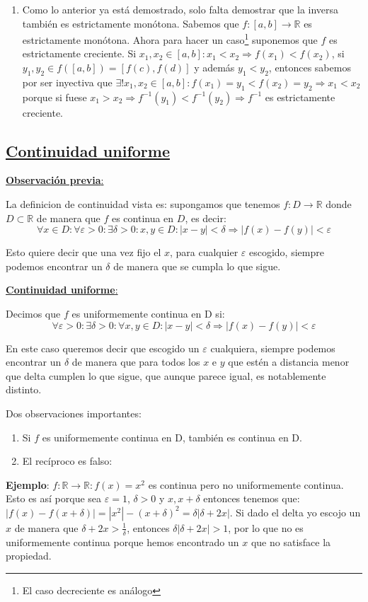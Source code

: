 \documentclass[10pt,a4paper,openright]{book}
\begin{document}
\begin{enumerate}
\item Como lo anterior ya está demostrado, solo falta demostrar que la inversa también es estrictamente monótona. Sabemos que $f: [a,b]\rightarrow \mathbb R$ es estrictamente monótona. Ahora para hacer un caso\footnote{El caso decreciente es análogo} suponemos que $f$ es estrictamente creciente. Si $x_1,x_2\in [a,b]: x_1<x_2\Rightarrow f(x_1)<f(x_2)$, si $y_1,y_2\in f([a,b])=[f(c), f(d)]$ y además $y_1<y_2$, entonces sabemos por ser inyectiva que $\exists! x_1, x_2\in [a,b]: f(x_1)=y_1 < f(x_2)=y_2\Rightarrow x_1< x_2$ porque si fuese $x_1>x_2\Rightarrow f^{-1}(y_1)<f^{-1}(y_2)\Rightarrow f^{-1}$ es estrictamente creciente.
\end{enumerate} 
\vspace{0.25cm}

\subsection*{\underline{Continuidad uniforme}}
\underline{\textbf{Observación previa}:}\par
La definicion de continuidad vista es: supongamos que tenemos $f: D\rightarrow \mathbb R$ donde $D\subset \mathbb R$ de manera que $f$ es continua en $D$, es decir:
$$\forall x\in D: \forall \varepsilon>0: \exists \delta>0 : x,y \in D: |x-y|<\delta\Rightarrow |f(x)-f(y)|<\varepsilon$$

Esto quiere decir que una vez fijo el $x$, para cualquier $\varepsilon$ escogido, siempre podemos encontrar un $\delta$ de manera que se cumpla lo que sigue.

\underline{\textbf{Continuidad uniforme}:}\par
Decimos que $f$ es uniformemente continua en D si:
$$\forall \varepsilon>0: \exists \delta>0 : \forall x, y \in D: |x-y|<\delta \Rightarrow |f(x)-f(y)|<\varepsilon$$

En este caso queremos decir que escogido un $\varepsilon$ cualquiera, siempre podemos encontrar un $\delta$ de manera que para todos los $x$ e $y$ que estén a distancia menor que delta cumplen lo que sigue, que aunque parece igual, es notablemente distinto.

Dos observaciones importantes:
\begin{enumerate}
\item Si $f$ es uniformemente continua en D, también es continua en D.

\item  El recíproco es falso:
\end{enumerate}
\textbf{Ejemplo}: $f: \mathbb R \rightarrow \mathbb R: f(x)=x^2$ es continua pero no uniformemente continua. Esto es así porque sea $\varepsilon=1$, $\delta >0$ y $x,x+\delta$ entonces tenemos que: $|f(x)-f(x+\delta)|=|x^2|-(x+\delta)^2=\delta|\delta +2x|$. Si dado el delta yo escojo un $x$ de manera que $\delta +2x > \frac{1}{\delta}$, entonces $\delta|\delta +2x|>1$, por lo que no es uniformemente continua porque hemos encontrado un $x$ que no satisface la propiedad.
\end{document}
